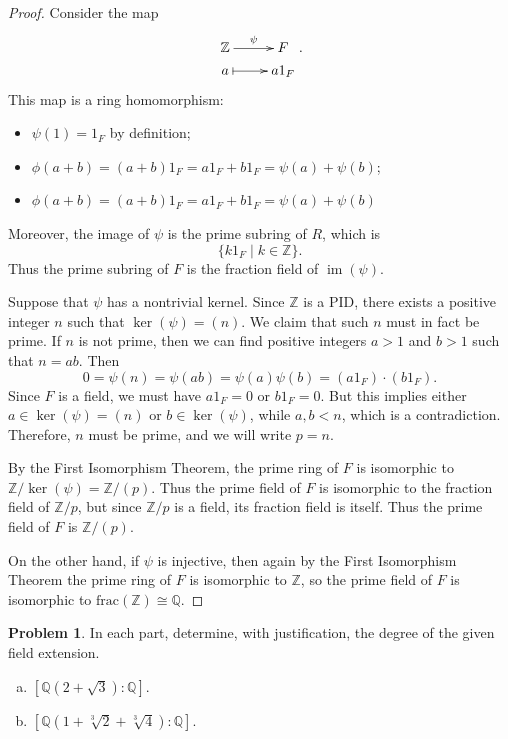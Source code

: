 \documentclass[11pt]{article}
\DeclareMathOperator{\im}{im}
\newcommand{\Q}{\mathbb{Q}}
\newcommand{\Z}{\mathbb{Z}}
\theoremstyle{definition}
\newtheorem{problem}{Problem}
\begin{document}
\begin{proof}
Consider the map
$$\xymatrix@R=1mm{\Z \ar[r]^-{\psi} & F \\ 
a \ar@{|->}[r] & a 1_F}.$$
This map is a ring homomorphism:
\begin{itemize}
	\item $\psi(1) = 1_F$ by definition;
	\item $\phi(a+b) = (a+b)1_F = a 1_F + b 1_F = \psi(a) + \psi(b)$;
	\item $\phi(a+b) = (a+b)1_F = a 1_F + b 1_F = \psi(a) + \psi(b)$
\end{itemize}

Moreover, the image of $\psi$ is the prime subring of $R$, which is
$$\{k1_F \mid k\in \Z\}.$$
Thus the prime subring of $F$ is the fraction field of $\im(\psi)$.

Suppose that $\psi$ has a nontrivial kernel. Since $\Z$ is a PID, there exists a positive integer $n$ such that $\ker(\psi) = (n)$. We claim that such $n$ must in fact be prime. If $n$ is not prime, then we can find positive integers $a > 1$ and $b > 1$ such that $n = ab$. Then
	$$0 = \psi(n) = \psi(ab) = \psi(a)\psi(b) = (a 1_F) \cdot (b 1_F).$$
	Since $F$ is a field, we must have $a 1_F = 0$ or $b 1_F = 0$. But this implies either $a \in \ker(\psi) = (n)$ or $b \in \ker(\psi)$, while $a, b < n$, which is a contradiction. Therefore, $n$ must be prime, and we will write $p = n$.
	
By the First Isomorphism Theorem, the prime ring of $F$ is isomorphic to $\Z/\ker(\psi) = \Z/(p)$.
Thus the prime field of $F$ is isomorphic to the fraction field of $\Z/p$, but since $\Z/p$ is a field, its fraction field is itself. Thus the prime field of $F$ is $\Z/(p)$.

On the other hand, if $\psi$ is injective, then again by the First Isomorphism Theorem the prime ring of $F$ is isomorphic to $\Z$, so the prime field of $F$ is isomorphic to $\textrm{frac}(\Z) \cong \Q$.
\end{proof}


\begin{problem}
In each part, determine, with justification, the degree of the given field extension.
\begin{enumerate}[a)]
\item $[\Q(2 + \sqrt{3}) : \Q]$.
\item $[\Q(1 + \sqrt[3]{2}+\sqrt[3]{4}) : \Q]$.
\end{enumerate}
\end{problem}
\end{document}
